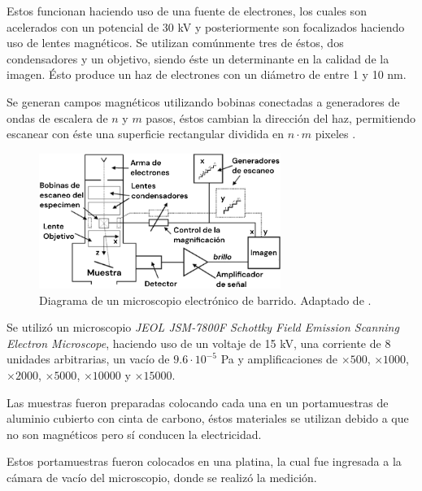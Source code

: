 \documentclass[../main.tex]{subfiles}
\begin{document}
Estos funcionan haciendo uso de una fuente de electrones, los cuales son acelerados con un potencial de 30 kV y posteriormente son focalizados haciendo uso de lentes magnéticos. Se utilizan comúnmente tres de éstos, dos condensadores y un objetivo, siendo éste un determinante en la calidad de la imagen. Ésto produce un haz de electrones con un diámetro de entre 1 y 10 nm.

Se generan campos magnéticos utilizando bobinas conectadas a generadores de ondas de escalera de $n$ y $m$ pasos, éstos cambian la dirección del haz, permitiendo escanear con éste una superficie rectangular dividida en $n\cdot m$ pixeles \cite{Egerton2005}.
\begin{figure}[H]
    \centering
    \includegraphics[width=0.7\textwidth]{fig/semdiag.png}
    \caption{Diagrama de un microscopio electrónico	de barrido. Adaptado de \cite{Egerton2005}.}
    \label{fig:semdiag}
\end{figure}
Se utilizó un microscopio \textit{JEOL JSM-7800F Schottky Field Emission Scanning Electron Microscope}, haciendo uso de un voltaje de 15 kV, una corriente de 8 unidades arbitrarias, un vacío de $9.6\cdot10^{-5}$ Pa y amplificaciones de $\times500$, $\times1000$, $\times2000$, $\times5000$, $\times10000$ y $\times15000$.

Las muestras fueron preparadas colocando cada una en un portamuestras de aluminio cubierto con cinta de carbono, éstos materiales se utilizan debido a que no son magnéticos pero sí conducen la electricidad.

Estos portamuestras fueron colocados en una platina, la cual fue ingresada a la cámara de vacío del microscopio, donde se realizó la medición. 
\end{document}
